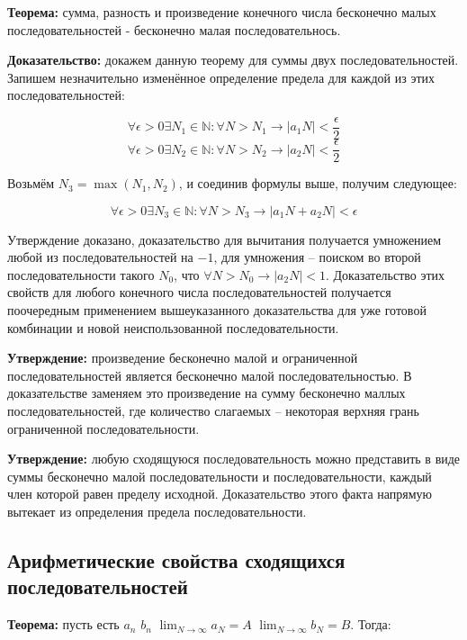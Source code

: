 \documentclass{article}
\begin{document}
\noindent{}

\textbf{Теорема:} сумма, разность и произведение конечного числа бесконечно малых последовательностей - бесконечно малая последовательнось.

\textbf{Доказательство:} докажем данную теорему для суммы двух последовательностей. Запишем незначительно изменённое определение предела для каждой из этих последовательностей:

\[ \forall \epsilon > 0 \exists N_1 \in \mathbb{N}: \forall N > N_1 \rightarrow |a_1N| < \frac{\epsilon}{2} \]
\[ \forall \epsilon > 0 \exists N_2 \in \mathbb{N}: \forall N > N_2 \rightarrow |a_2N| < \frac{\epsilon}{2} \]

Возьмём $N_3 = \max(N_1, N_2)$, и соединив формулы выше, получим следующее:

\[ \forall \epsilon > 0 \exists N_3 \in \mathbb{N}: \forall N > N_3 \rightarrow |a_1N + a_2N| < \epsilon \]

Утверждение доказано, доказательство для вычитания получается умножением любой из последовательностей на $-1$, для умножения -- поиском во второй последовательности такого $N_0$, что $\forall N > N_0 \rightarrow |a_2N| < 1$.
Доказательство этих свойств для любого конечного числа последовательностей получается поочередным применением вышеуказанного доказательства для уже готовой комбинации и новой неиспользованной последовательности.

\textbf{Утверждение:} произведение бесконечно малой и ограниченной последовательностей является бесконечно малой последовательностью. В доказательстве заменяем это произведение на сумму бесконечно маллых последовательностей, где количество слагаемых -- некоторая верхняя грань ограниченной последовательности.

\textbf{Утверждение:} любую сходящуюся последовательность можно представить в виде суммы бесконечно малой последовательности и последовательности, каждый член которой равен пределу исходной. Доказательство этого факта напрямую вытекает из определения предела последовательности.

\subsection{Арифметические свойства сходящихся последовательностей}

\textbf{Теорема:} пусть есть $a_n$ $b_n$ $\lim_{N\rightarrow\infty}a_N = A$ $\lim_{N\rightarrow\infty} b_N = B$. Тогда:
\end{document}
